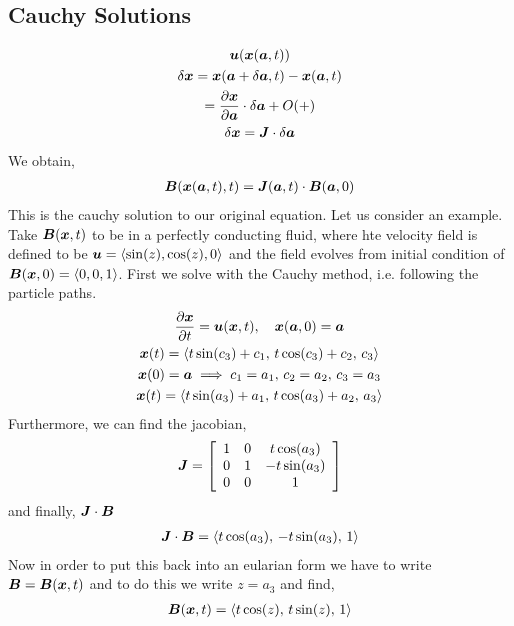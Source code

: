 \documentclass{article}
\begin{document}
\subsection{Cauchy Solutions}
\begin{gather*}
    \boldsymbol{u}(\boldsymbol{x}(\boldsymbol{a},t))\\
    \delta \boldsymbol{x} = \boldsymbol{x}(\boldsymbol{a} + \delta \boldsymbol{a}, t) - \boldsymbol{x}(\boldsymbol{a},t)\\
    = \frac{\partial \boldsymbol{x}}{\partial \boldsymbol{a}} \cdot \delta \boldsymbol{a} + O(+)\\
    \delta \boldsymbol{x} = \boldsymbol{J}\cdot\delta\boldsymbol{a}
\end{gather*}
We obtain, \
\begin{gather*}
    \boldsymbol{B}(\boldsymbol{x}(\boldsymbol{a},t),t) = \boldsymbol{J}(\boldsymbol{a},t)\cdot \boldsymbol{B}(\boldsymbol{a},0)
\end{gather*}
This is the cauchy solution to our original equation. 
Let us consider an example. Take $\boldsymbol{B}(\boldsymbol{x},t)$ to be in a perfectly conducting
fluid, where hte velocity field is defined to be $\boldsymbol{u} = \left< \sin(z),
\cos(z), 0\right>$ and the field evolves from initial condition of $\boldsymbol{B}(\boldsymbol{x}, 0) =
\left<0, 0, 1\right>$. 
First we solve with the Cauchy method, i.e. following the particle paths. 
\begin{gather*}
   \frac{\partial \boldsymbol{x}}{\partial t} = \boldsymbol{u}(\boldsymbol{x},t), \quad \boldsymbol{x}(\boldsymbol{a}, 0) = \boldsymbol{a}\\
   \boldsymbol{x}(t) = \left< t\sin(c_3) + c_1,\, t\cos(c_3) + c_2,\, c_3\right>\\
   \boldsymbol{x}(0) = \boldsymbol{a} \implies c_1 = a_1,\, c_2 = a_2,\, c_3 = a_3\\
   \boldsymbol{x}(t) = \left< t\sin(a_3) + a_1,\, t\cos(a_3) + a_2,\, a_3\right>
\end{gather*}
Furthermore, we can find the jacobian,
\begin{gather*}
    \boldsymbol{J} = \left[\begin{array}{c c c}
        1 & 0 & t\cos(a_3)\\
        0 & 1 & -t\sin(a_3)\\
        0 & 0 & 1
    \end{array}\right]
\end{gather*}
and finally, $\boldsymbol{J}\cdot\boldsymbol{B}$ 
\begin{gather*}
    \boldsymbol{J}\cdot\boldsymbol{B} = \left< t\cos(a_3),\, -t\sin(a_3),\, 1\right>
\end{gather*}
Now in order to put this back into an eularian form we have to write $\boldsymbol{B} =
\boldsymbol{B}(\boldsymbol{x},t)$ and to do this we write $z = a_3$ and find, 
\begin{gather*}
    \boldsymbol{B}(\boldsymbol{x},t) = \left< t\cos(z),\, t\sin(z),\, 1\right>
\end{gather*}

\begin{gather*}
\end{gather*}
\end{document}
